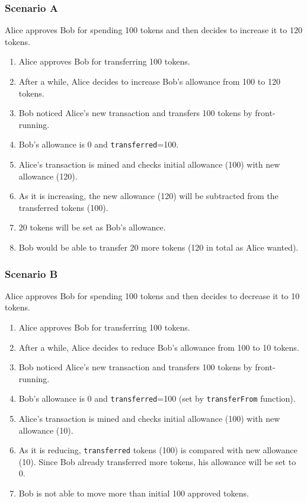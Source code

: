 
\subsubsection*{Scenario A} Alice approves Bob for spending 100 tokens and then decides to increase it to 120 tokens.
\begin{enumerate}
	\item Alice approves Bob for transferring 100 tokens.
	\item After a while, Alice decides to increase Bob’s allowance from 100 to 120 tokens.
	\item Bob noticed Alice’s new transaction and transfers 100 tokens by front-running.
	\item Bob’s allowance is 0 and \texttt{transferred}=100.
	\item Alice’s transaction is mined and checks initial allowance (100) with new allowance (120).
	\item As it is increasing, the new allowance (120) will be subtracted from the transferred tokens (100).
	\item 20 tokens will be set as Bob’s allowance.
	\item Bob would be able to transfer 20 more tokens (120 in total as Alice wanted).\newline
\end{enumerate}
 
\subsubsection*{Scenario B} Alice approves Bob for spending 100 tokens and then decides to decrease it to 10 tokens.
\begin{enumerate}
	\item Alice approves Bob for transferring 100 tokens.
	\item After a while, Alice decides to reduce Bob’s allowance from 100 to 10 tokens.
	\item Bob noticed Alice’s new transaction and transfers 100 tokens by front-running.
	\item Bob’s allowance is 0 and \texttt{transferred}=100 (set by \texttt{transferFrom} function).
	\item Alice’s transaction is mined and checks initial allowance (100) with new allowance (10).
	\item As it is reducing, \texttt{transferred} tokens (100) is compared with new allowance (10). Since Bob already transferred more tokens, his allowance will be set to 0.
	\item Bob is not able to move more than initial 100 approved tokens.
\end{enumerate}

